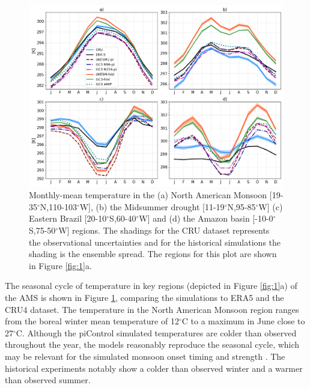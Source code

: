 
\begin{figure}[t!]
\centering
 \includegraphics[width=\linewidth]{figures/p2fig2_v3.png}
\caption[Seasonal cycle of surface temperature in key monsoon regions]{ Monthly-mean temperature in the (a) North American Monsoon [19-35$^\circ$N,110-103$^\circ$W], (b) the Midsummer drought [11-19$^\circ$N,95-85$^\circ$W] (c) Eastern Brazil [20-10$^\circ$S,60-40$^\circ$W] and (d) the Amazon basin [-10-0$^\circ$S,75-50$^\circ$W] regions. The shadings for the CRU dataset represents the observational uncertainties and for the historical simulations the shading is the ensemble spread. The regions for this plot are shown in Figure \ref{fig:1}a. }
\label{fig:2}
\end{figure}

The seasonal cycle of temperature in key regions (depicted in Figure \ref{fig:1}a) of the AMS is shown in Figure \ref{fig:2}, comparing the simulations to ERA5 and the CRU4 dataset.
The temperature in the North American Monsoon region ranges from the boreal winter mean temperature of 12$^\circ$C to a maximum in June close to 27$^\circ$C.
Although the piControl simulated temperatures are colder than observed throughout the year, the models reasonably reproduce the seasonal cycle, which may be relevant for the simulated monsoon onset timing and strength \citep{turrent2009}. The historical experiments notably show a colder than observed winter and a warmer than observed summer.

